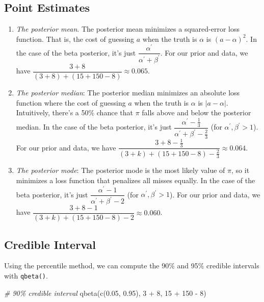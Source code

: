 \documentclass[
]{book}
\newenvironment{Shaded}{\begin{snugshade}}{\end{snugshade}}
\newcommand{\CommentTok}[1]{\textcolor[rgb]{0.56,0.35,0.01}{\textit{#1}}}
\newcommand{\DecValTok}[1]{\textcolor[rgb]{0.00,0.00,0.81}{#1}}
\newcommand{\FloatTok}[1]{\textcolor[rgb]{0.00,0.00,0.81}{#1}}
\newcommand{\FunctionTok}[1]{\textcolor[rgb]{0.00,0.00,0.00}{#1}}
\newcommand{\NormalTok}[1]{#1}
\newcommand{\SpecialCharTok}[1]{\textcolor[rgb]{0.00,0.00,0.00}{#1}}
\providecommand{\tightlist}{%
  \setlength{\itemsep}{0pt}\setlength{\parskip}{0pt}}
\begin{document}
\hypertarget{point-estimates}{%
\subsection{Point Estimates}\label{point-estimates}}

\begin{enumerate}
\def\labelenumi{\arabic{enumi}.}
\tightlist
\item
  \emph{The posterior mean}. The posterior mean minimizes a squared-error loss function. That is, the cost of guessing \(a\) when the truth is \(\alpha\) is \((a - \alpha)^2\). In the case of the beta posterior, it's just \(\dfrac{\alpha^\prime}{\alpha^\prime + \beta^\prime}\). For our prior and data, we have \(\dfrac{3 + 8}{(3 + 8) + (15 + 150 - 8)} \approx 0.065\).
\item
  \emph{The posterior median}: The posterior median minimizes an absolute loss function where the cost of guessing \(a\) when the truth is \(\alpha\) is \(|a - \alpha|\). Intuitively, there's a 50\% chance that \(\pi\) falls above and below the posterior median. In the case of the beta posterior, it's just \(\dfrac{\alpha^\prime - \frac{1}{3}}{\alpha^\prime + \beta^\prime - \frac{2}{3}}\) (for \(\alpha^\prime, \beta^\prime > 1\)). For our prior and data, we have \(\dfrac{3 + 8 -\frac{1}{3}}{(3 + k) + (15 + 150 - 8) - \frac{2}{3}} \approx 0.064\).
\item
  \emph{The posterior mode}: The posterior mode is the most likely value of \(\pi\), so it minimizes a loss function that penalizes all misses equally. In the case of the beta posterior, it's just \(\dfrac{\alpha^\prime - 1}{\alpha^\prime + \beta^\prime - 2}\) (for \(\alpha^\prime, \beta^\prime > 1\)). For our prior and data, we have \(\dfrac{3 + 8 - 1}{(3 + k) + (15 + 150 - 8) - 2} \approx 0.060\).
\end{enumerate}

\hypertarget{credible-interval}{%
\subsection{Credible Interval}\label{credible-interval}}

Using the percentile method, we can compute the 90\% and 95\% credible intervals with \texttt{qbeta()}.

\begin{Shaded}
\begin{Highlighting}[]
\CommentTok{\# 90\% credible interval}
\FunctionTok{qbeta}\NormalTok{(}\FunctionTok{c}\NormalTok{(}\FloatTok{0.05}\NormalTok{, }\FloatTok{0.95}\NormalTok{), }\DecValTok{3} \SpecialCharTok{+} \DecValTok{8}\NormalTok{, }\DecValTok{15} \SpecialCharTok{+} \DecValTok{150} \SpecialCharTok{{-}} \DecValTok{8}\NormalTok{)}
\end{Highlighting}
\end{Shaded}
\end{document}

